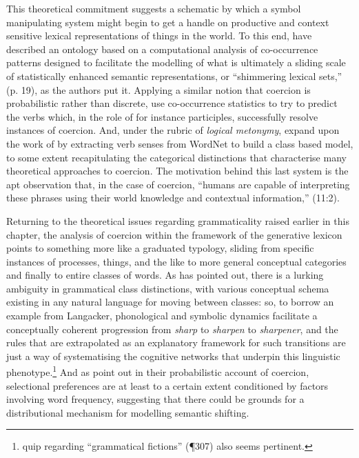 This theoretical commitment suggests a schematic by which a symbol manipulating system might begin to get a handle on productive and context sensitive lexical representations of things in the world.  To this end, \cite{JezekEA2010} have described an ontology based on a computational analysis of co-occurrence patterns designed to facilitate the modelling of what is ultimately a sliding scale of statistically enhanced semantic representations, or ``shimmering lexical sets,'' (p. 19), as the authors put it.  Applying a similar notion that coercion is probabilistic rather than discrete, \cite{LapataEA2003} use co-occurrence statistics to try to predict the verbs which, in the role of for instance participles, successfully resolve instances of coercion.  And, under the rubric of \emph{logical metonymy}, \cite{ShutovaEA2013b} expand upon the work of \citeauthor{LapataEA2003} by extracting verb senses from WordNet to build a class based model, to some extent recapitulating the categorical distinctions that characterise many theoretical approaches to coercion.  The motivation behind this last system is the apt observation that, in the case of coercion, ``humans are capable of interpreting these phrases using their world knowledge and contextual information,'' (11:2).

Returning to the theoretical issues regarding grammaticality raised earlier in this chapter, the analysis of coercion within the framework of the generative lexicon points to something more like a graduated typology, sliding from specific instances of processes, things, and the like to more general conceptual categories and finally to entire classes of words.  As \cite{Langacker1991} has pointed out, there is a lurking ambiguity in grammatical class distinctions, with various conceptual schema existing in any natural language for moving between classes: so, to borrow an example from Langacker, phonological and symbolic dynamics facilitate a conceptually coherent progression from \emph{sharp} to \emph{sharpen} to \emph{sharpener}, and the rules that are extrapolated as an explanatory framework for such transitions are just a way of systematising the cognitive networks that underpin this linguistic phenotype.\footnote{ quip regarding ``grammatical fictions'' (\P 307) also seems pertinent.}  And as \cite{CopestakeEA1995} point out in their probabilistic account of coercion, selectional preferences are at least to a certain extent conditioned by factors involving word frequency, suggesting that there could be grounds for a distributional mechanism for modelling semantic shifting.

